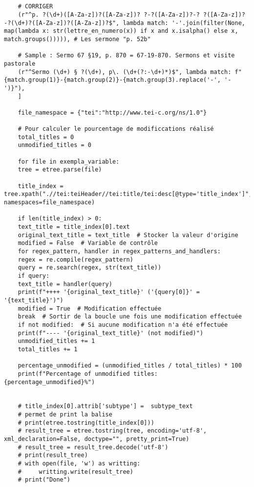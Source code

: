 \begin{lstlisting}[breaklines=true]
	
	
	# CORRIGER  
	(r"^p. ?(\d+)([A-Za-z])?([A-Za-z])? ?-?([A-Za-z])?-? ?([A-Za-z])?-?(\d+)?([A-Za-z])?([A-Za-z])?$", lambda match: '-'.join(filter(None, map(lambda x: str(lettre_en_numero(x)) if x and x.isalpha() else x, match.groups())))), # Les sermone "p. 52b"
	
	# Sample : Sermo 67 §19, p. 870 = 67-19-870. Sermons et visite pastorale
	(r"^Sermo (\d+) § ?(\d+), p\. (\d+(?:-\d+)*)$", lambda match: f"{match.group(1)}-{match.group(2)}-{match.group(3).replace('-', '-')}"),
	]
	
	file_namespace = {"tei":"http://www.tei-c.org/ns/1.0"}
	
	# Pour calculer le pourcentage de modificcations réalisé
	total_titles = 0 
	unmodified_titles = 0
	
	for file in exempla_variable:
	tree = etree.parse(file)
	
	title_index = tree.xpath(".//tei:teiHeader//tei:title/tei:desc[@type='title_index']", namespaces=file_namespace)
	
	if len(title_index) > 0:
	text_title = title_index[0].text
	original_text_title = text_title  # Stocker la valeur d'origine
	modified = False  # Variable de contrôle
	for regex_pattern, handler in regex_patterns_and_handlers:
	regex = re.compile(regex_pattern)        
	query = re.search(regex, str(text_title))
	if query:
	text_title = handler(query)
	print(f"++++ '{original_text_title}' ('{query[0]}' = '{text_title}')")
	modified = True  # Modification effectuée
	break  # Sortir de la boucle une fois une modification effectuée
	if not modified:  # Si aucune modification n'a été effectuée
	print(f"---- '{original_text_title}' (not modified)")
	unmodified_titles += 1
	total_titles += 1
	
	percentage_unmodified = (unmodified_titles / total_titles) * 100
	print(f"Percentage of unmodified titles: {percentage_unmodified}%")
	
	
	# title_index[0].attrib['subtype'] =  subtype_text
	# permet de print la balise
	# print(etree.tostring(title_index[0]))
	# result_tree = etree.tostring(tree, encoding='utf-8', xml_declaration=False, doctype="", pretty_print=True)
	# result_tree = result_tree.decode('utf-8')
	# print(result_tree)
	# with open(file, 'w') as writting:
	#     writting.write(result_tree)
	# print("Done")
	
\end{lstlisting}